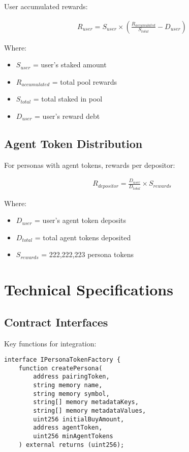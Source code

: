 \documentclass{article}
\begin{document}
\begin{appendices}
User accumulated rewards:

\begin{align}
R_{user} = S_{user} \times \left(\frac{R_{accumulated}}{S_{total}} - D_{user}\right)
\end{align}

Where:
\begin{itemize}
    \item $S_{user}$ = user's staked amount
    \item $R_{accumulated}$ = total pool rewards
    \item $S_{total}$ = total staked in pool
    \item $D_{user}$ = user's reward debt
\end{itemize}

\subsection{Agent Token Distribution}

For personas with agent tokens, rewards per depositor:

\begin{align}
R_{depositor} = \frac{D_{user}}{D_{total}} \times S_{rewards}
\end{align}

Where:
\begin{itemize}
    \item $D_{user}$ = user's agent token deposits
    \item $D_{total}$ = total agent tokens deposited
    \item $S_{rewards}$ = 222,222,223 persona tokens
\end{itemize}

\section{Technical Specifications}

\subsection{Contract Interfaces}

Key functions for integration:

\begin{verbatim}
interface IPersonaTokenFactory {
    function createPersona(
        address pairingToken,
        string memory name,
        string memory symbol,
        string[] memory metadataKeys,
        string[] memory metadataValues,
        uint256 initialBuyAmount,
        address agentToken,
        uint256 minAgentTokens
    ) external returns (uint256);
    

\end{verbatim}
\end{appendices}
\end{document}
